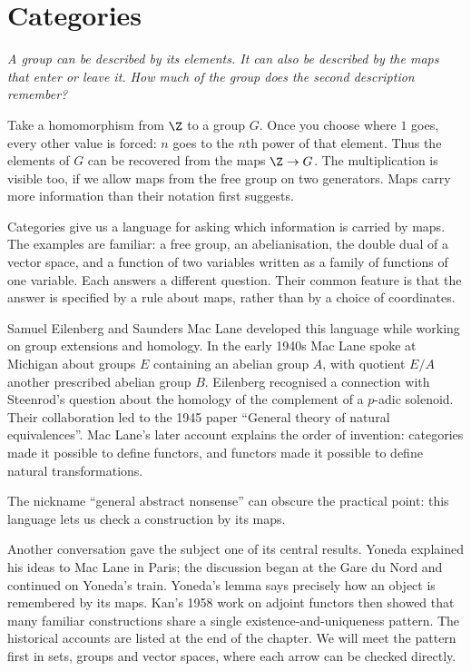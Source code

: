 \chapter{Categories}

\begin{center}\itshape
A group can be described by its elements. It can also be described by the maps that enter or leave it. How much of the group does the second description remember?
\end{center}

Take a homomorphism from $\Z$ to a group $G$. Once you choose where $1$ goes, every other value is forced: $n$ goes to the $n$th power of that element. Thus the elements of $G$ can be recovered from the maps $\Z\to G$. The multiplication is visible too, if we allow maps from the free group on two generators. Maps carry more information than their notation first suggests.

Categories give us a language for asking which information is carried by maps. The examples are familiar: a free group, an abelianisation, the double dual of a vector space, and a function of two variables written as a family of functions of one variable. Each answers a different question. Their common feature is that the answer is specified by a rule about maps, rather than by a choice of coordinates.

Samuel Eilenberg and Saunders Mac Lane developed this language while working on group extensions and homology. In the early 1940s Mac Lane spoke at Michigan about groups $E$ containing an abelian group $A$, with quotient $E/A$ another prescribed abelian group $B$. Eilenberg recognised a connection with Steenrod's question about the homology of the complement of a $p$-adic solenoid. Their collaboration led to the 1945 paper ``General theory of natural equivalences''. Mac Lane's later account explains the order of invention: categories made it possible to define functors, and functors made it possible to define natural transformations.

The nickname ``general abstract nonsense'' can obscure the practical point: this language lets us check a construction by its maps.

Another conversation gave the subject one of its central results. Yoneda explained his ideas to Mac Lane in Paris; the discussion began at the Gare du Nord and continued on Yoneda's train. Yoneda's lemma says precisely how an object is remembered by its maps. Kan's 1958 work on adjoint functors then showed that many familiar constructions share a single existence-and-uniqueness pattern. The historical accounts are listed at the end of the chapter. We will meet the pattern first in sets, groups and vector spaces, where each arrow can be checked directly.

